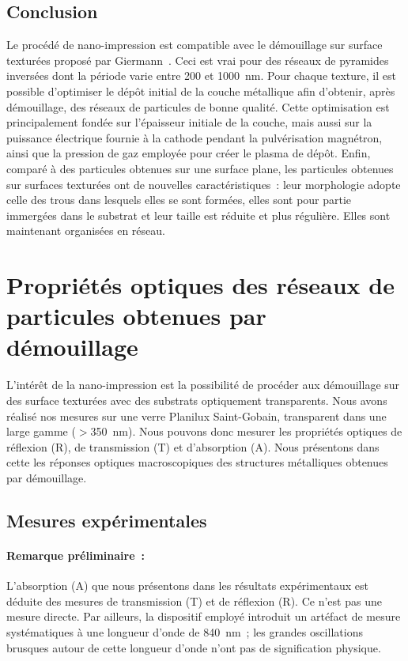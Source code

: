 \subsection{Conclusion}
Le procédé de nano-impression est compatible avec le démouillage sur surface texturées proposé par Giermann~\cite{giermann2005solid}. Ceci est vrai pour des réseaux de pyramides inversées dont la période varie entre 200 et 1000~nm. Pour chaque texture, il est possible d'optimiser le dépôt initial de la couche métallique afin d'obtenir, après démouillage, des réseaux de particules de bonne qualité. Cette optimisation est principalement fondée sur l'épaisseur initiale de la couche, mais aussi sur la puissance électrique fournie à la cathode pendant la pulvérisation magnétron, ainsi que la pression de gaz employée pour créer le plasma de dépôt. Enfin, comparé à des particules obtenues sur une surface plane, les particules obtenues sur surfaces texturées ont de nouvelles caractéristiques~: leur morphologie adopte celle des trous dans lesquels elles se sont formées, elles sont pour partie immergées dans le substrat et leur taille est réduite et plus régulière. Elles sont maintenant organisées en réseau.\par 

\section[Propriétés optiques des réseaux de particules ]{Propriétés optiques des réseaux de particules obtenues par démouillage}
L'intérêt de la nano-impression est la possibilité de procéder aux démouillage sur des surface texturées avec des substrats optiquement transparents. Nous avons réalisé nos mesures sur une verre Planilux Saint-Gobain, transparent dans une large gamme ($>$350~nm). Nous pouvons donc mesurer les propriétés optiques de réflexion (R), de transmission (T) et d’absorption (A). Nous présentons dans cette les réponses optiques macroscopiques des structures métalliques obtenues par démouillage.\par 

\subsection{Mesures expérimentales}
\paragraph*{Remarque préliminaire~:} L'absorption (A) que nous présentons dans les résultats expérimentaux est déduite des mesures de transmission (T) et de réflexion (R). Ce n'est pas une mesure directe. Par ailleurs, la dispositif employé introduit un artéfact de mesure systématiques à une longueur d'onde de 840~nm~; les grandes oscillations brusques autour de cette longueur d'onde n'ont pas de signification physique.\par 

